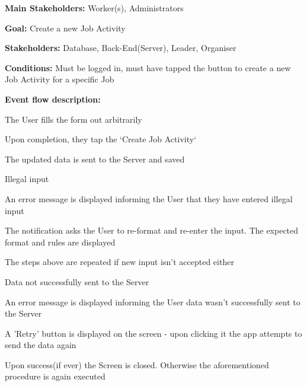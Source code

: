 			\noindent {}
			\begin{packed_item}
				\item \textbf{Main Stakeholders:} Worker(s), Administrators
				\item \textbf{Goal:} Create a new Job Activity
				\item \textbf{Stakeholders: } Database, Back-End(Server), Leader, Organiser
				\item \textbf{Conditions: } Must be logged in, must have tapped the button to create a new Job Activity for a specific Job
				\item \textbf{Event flow description: }
				\begin{packed_enum}
					\item The User fills the form out arbitrarily
					\item Upon completion, they tap the `Create Job Activity`
					\item The updated data is sent to the Server and saved
				\end{packed_enum}
				
				\begin{packed_item}
					\item[1.a] Illegal input
					\item[] \begin{packed_enum}
						\item An error message is displayed informing the User that they have entered illegal input
						\item The notification asks the User to re-format and re-enter the input. The expected format and rules are displayed
						\item The steps above are repeated if new input isn't accepted either
					\end{packed_enum}
					
					\item[3.a] Data not successfully sent to the Server
					\item[] \begin{packed_enum}
						\item An error message is displayed informing the User data wasn't successfully sent to the Server
						\item A 'Retry' button is displayed on the screen - upon clicking it the app attempts to send the data again
						\item Upon success(if ever) the Screen is closed. Otherwise the aforementioned procedure is again executed
					\end{packed_enum}
				\end{packed_item}
			\end{packed_item}
			
